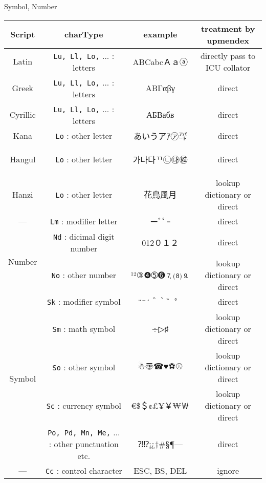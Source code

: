 \documentclass[aspectratio=169,10pt]{beamer}
\newcommand{\colBl}{\color{blue}}
\begin{document}
\begin{frame}{Symbol, Number}

\begin{center}
\scriptsize
\begin{tabular}{c|cc|c}
Script     & charType & example & treatment by upmendex \\\hline\hline
Latin      & \texttt{\colBl Lu, Ll, Lo,} ... : letters & ABCabcＡａⓐ & directly pass to ICU collator \\
Greek      & \texttt{\colBl Lu, Ll, Lo,} ... : letters & ΑΒΓαβγ & direct \\
Cyrillic   & \texttt{\colBl Lu, Ll, Lo,} ... : letters & АБВабв  & direct \\
Kana       & \texttt{\colBl Lo} : other letter & あいうアｱ㋐㌀ & direct \\
Hangul     & \texttt{\colBl Lo} : other letter & \begin{korean}가나다ᄁ㉡㉰㉼\end{korean} & direct \\
Hanzi      & \texttt{\colBl Lo} : other letter & 花鳥風月 & lookup dictionary or direct \\
---        & \texttt{\colBl Lm} : modifier letter   & ーﾞﾟｰ & direct \\\hline
\multirow{2}{*}{Number}  & \texttt{\colBl Nd} : dicimal digit number & 012０１２ & direct \\
           & \texttt{\colBl No}      : other number & ¹²③❹➄➏🄈⑻⒐ & lookup dictionary or direct \\\hline
\multirow{5}{*}{Symbol}  & \texttt{\colBl Sk} : modifier symbol   & ¨¯´＾｀゛゜& direct \\
           & \texttt{\colBl Sm} : math symbol       & ÷▷♯ & lookup dictionary or direct \\
           & \texttt{\colBl So}               : other symbol      & ☃〠☎♥⚽⚾ & lookup dictionary or direct \\
           & \texttt{\colBl Sc}               : currency symbol   & €\$＄¢£¥￥₩￦ & lookup dictionary or direct \\
           & \texttt{\colBl Po, Pd, Mn, Me,} ... : other punctuation etc. & ⁈⁉¡¿†\#§¶— & direct \\\hline
---        & \texttt{\colBl Cc}                 : control character & ESC, BS, DEL & ignore \\

\end{tabular}
\end{center}
\end{frame}
\end{document}
